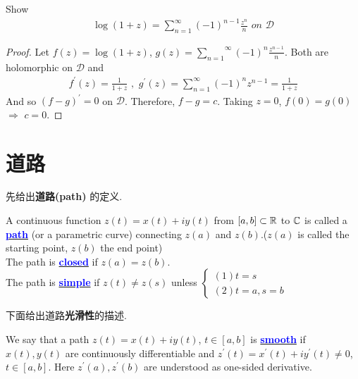 	\vspace{2em}
	\begin{proposition}\label{prop 3.3.2}
		Show
		\begin{align}
			\log{(1 + z)} = \sum_{n = 1}^{\infty}{(-1)^{n - 1}\frac{z^n}{n}} \,\, on \,\, \mathcal{D}
		\end{align}
	
		\vspace{2em}
		\begin{proof}
			Let $f(z) = \log{(1 + z)}$, $g(z) = \overset{\infty}{\underset{n = 1}{\sum}}{(-1)^n \frac{z^{n - 1}}{n}}$. Both are holomorphic on $\mathcal{D}$ and
			\begin{align}
				f^{'}(z) = \frac{1}{1 + z} \,\, , \,\, g^{'}(z) = \sum_{n = 1}^{\infty}{(-1)^n z^{n - 1}} = \frac{1}{1 + z}
			\end{align}
			And so $(f - g)^{'} = 0$ on $\mathcal{D}$. Therefore, $f - g = c$. Taking $z = 0$, $f(0) = g(0)$ $\Rightarrow$ $c = 0$.
		\end{proof}
	\end{proposition}

\newpage
\section{道路}
	先给出\textbf{道路(path)} 的定义.
	\begin{defn}\label{def 3.4.1}
		A continuous function $z(t) = x(t) + i y(t)$ from $[a , b] \subset \mathbb{R}$ to $\mathbb{C}$ is called a \underline{\textcolor{blue}{\textbf{path}}} (or a parametric curve) connecting $z(a)$ and $z(b)$.($z(a)$ is called the starting point, $z(b)$ the end point)\\
		The path is \underline{\textcolor{blue}{\textbf{closed}}} if $z(a) = z(b)$.\\
		The path is \underline{\textcolor{blue}{\textbf{simple}}} if $z(t) \neq z(s)$ unless 
		$\begin{cases}
			(1) t = s\\
			(2) t = a , s = b
		\end{cases}$
	\end{defn}
	
	\vspace{2em}
	下面给出道路\textbf{光滑性}的描述.
	\begin{defn}\label{def 3.4.2}
		We say that a path $z(t) = x(t) + i y(t)$, $t \in [a , b]$ is \underline{\textcolor{blue}{\textbf{smooth}}} if $x(t) , y(t)$ are continuously differentiable and $z^{'}(t) = x^{'}(t) + i y^{'}(t) \neq 0$, $t \in [a , b]$. Here $z^{'}(a) , z^{'}(b)$ are understood as one-sided derivative.
	\end{defn}

